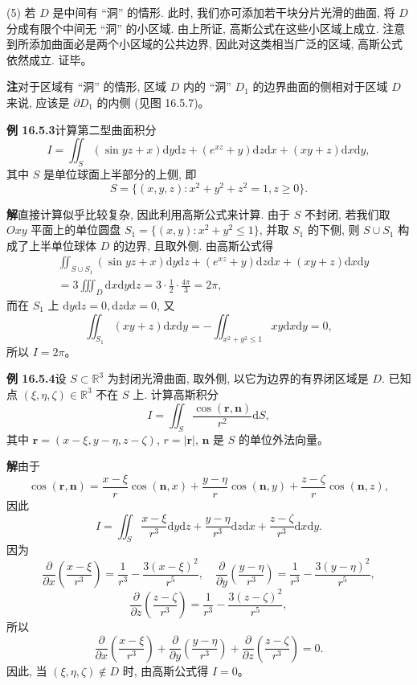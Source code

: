 \documentclass[UTF8, 12pt, fontset=fandol, oneside]{ctexart}
\begin{document}
(5) 若 $D$ 是中间有 ``洞'' 的情形. 此时, 我们亦可添加若干块分片光滑的曲面, 将 $D$ 分成有限个中间无 ``洞'' 的小区域. 由上所证, 高斯公式在这些小区域上成立. 注意到所添加曲面必是两个小区域的公共边界, 因此对这类相当广泛的区域, 高斯公式依然成立. 证毕。

\noindent\textbf{注}\quad 对于区域有 ``洞'' 的情形, 区域 $D$ 内的 ``洞'' $D_1$ 的边界曲面的侧相对于区域 $D$ 来说, 应该是 $\partial D_1$ 的内侧 (见图 16.5.7)。

\noindent\textbf{例 16.5.3}\quad 计算第二型曲面积分
\[
  I=\iint_S(\sin yz+x)\mathrm dy\mathrm dz+(e^{xz}+y)\mathrm dz\mathrm dx+(xy+z)\mathrm dx\mathrm dy,
\]
其中 $S$ 是单位球面上半部分的上侧, 即
\[
  S=\{(x,y,z):x^2+y^2+z^2=1,z\ge0\}.
\]

\noindent\textbf{解}\quad 直接计算似乎比较复杂, 因此利用高斯公式来计算. 由于 $S$ 不封闭, 若我们取 $Oxy$ 平面上的单位圆盘 $S_1=\{(x,y):x^2+y^2\le1\}$, 并取 $S_1$ 的下侧, 则 $S\cup S_1$ 构成了上半单位球体 $D$ 的边界, 且取外侧. 由高斯公式得
\[
\begin{aligned}
  &\iint_{S\cup S_1}(\sin yz+x)\mathrm dy\mathrm dz+(e^{xz}+y)\mathrm dz\mathrm dx+(xy+z)\mathrm dx\mathrm dy\\
  &=3\iiint_D\mathrm dx\mathrm dy\mathrm dz
    =3\cdot\frac12\cdot\frac{4\pi}{3}=2\pi,
\end{aligned}
\]
而在 $S_1$ 上 $\mathrm dy\mathrm dz=0,\mathrm dz\mathrm dx=0$, 又
\[
  \iint_{S_1}(xy+z)\mathrm dx\mathrm dy
  =-\iint_{x^2+y^2\le1}xy\mathrm dx\mathrm dy=0,
\]
所以 $I=2\pi$。

\noindent\textbf{例 16.5.4}\quad 设 $S\subset\mathbb R^3$ 为封闭光滑曲面, 取外侧, 以它为边界的有界闭区域是 $D$. 已知点 $(\xi,\eta,\zeta)\in\mathbb R^3$ 不在 $S$ 上. 计算高斯积分
\[
  I=\iint_S\frac{\cos(\boldsymbol r,\boldsymbol n)}{r^2}\mathrm dS,
\]
其中 $\boldsymbol r=(x-\xi,y-\eta,z-\zeta)$, $r=|\boldsymbol r|$, $\boldsymbol n$ 是 $S$ 的单位外法向量。

\noindent\textbf{解}\quad 由于
\[
  \cos(\boldsymbol r,\boldsymbol n)
  =\frac{x-\xi}{r}\cos(\boldsymbol n,x)
   +\frac{y-\eta}{r}\cos(\boldsymbol n,y)
   +\frac{z-\zeta}{r}\cos(\boldsymbol n,z),
\]
因此
\[
  I=\iint_S\frac{x-\xi}{r^3}\mathrm dy\mathrm dz
    +\frac{y-\eta}{r^3}\mathrm dz\mathrm dx
    +\frac{z-\zeta}{r^3}\mathrm dx\mathrm dy.
\]
因为
\[
  \frac{\partial}{\partial x}\left(\frac{x-\xi}{r^3}\right)=\frac1{r^3}-\frac{3(x-\xi)^2}{r^5},\quad
  \frac{\partial}{\partial y}\left(\frac{y-\eta}{r^3}\right)=\frac1{r^3}-\frac{3(y-\eta)^2}{r^5},
\]
\[
  \frac{\partial}{\partial z}\left(\frac{z-\zeta}{r^3}\right)=\frac1{r^3}-\frac{3(z-\zeta)^2}{r^5},
\]
所以
\[
  \frac{\partial}{\partial x}\left(\frac{x-\xi}{r^3}\right)
  +\frac{\partial}{\partial y}\left(\frac{y-\eta}{r^3}\right)
  +\frac{\partial}{\partial z}\left(\frac{z-\zeta}{r^3}\right)=0.
\]
因此, 当 $(\xi,\eta,\zeta)\notin D$ 时, 由高斯公式得 $I=0$。
\end{document}
